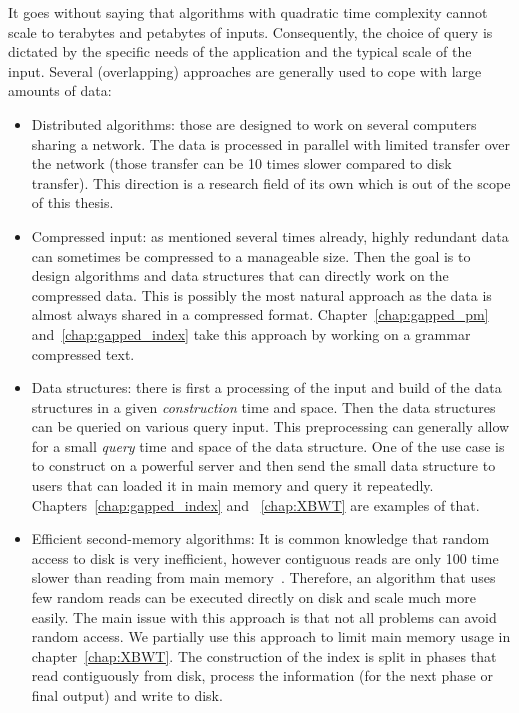 It goes without saying that algorithms with quadratic time complexity cannot scale to terabytes and petabytes of inputs. Consequently, the choice of query is dictated by the specific needs of the application and the typical scale of the input.
Several (overlapping) approaches are generally used to cope with large amounts of data:
\begin{itemize}

\item Distributed algorithms: those are designed to work on several computers sharing a network. The data is processed in parallel with limited transfer over the network (those transfer can be 10 times slower compared to disk transfer). This direction is a research field of its own which is out of the scope of this thesis.
\item Compressed input: as mentioned several times already, highly redundant data can sometimes be compressed to a manageable size. Then the goal is to design algorithms and data structures that can directly work on the compressed data. This is possibly the most natural approach as the data is almost always shared in a compressed format. Chapter~\ref{chap:gapped_pm} and~\ref{chap:gapped_index} take this approach by working on a grammar compressed text.
\item Data structures: there is first a processing of the input and build of the data structures in a given \emph{construction} time and space. Then the data structures can be queried on various query input. This preprocessing can generally allow for a small \emph{query} time and space of the data structure. One of the use case is to construct on a powerful server and then send the small data structure to users that can loaded it in main memory and query it repeatedly. Chapters~\ref{chap:gapped_index} and ~\ref{chap:XBWT} are examples of that.
\item Efficient second-memory algorithms: It is  common knowledge that random access to disk is very inefficient, however contiguous reads are only 100 time slower than reading from main memory~\cite{navarro2016compact}. Therefore, an algorithm that uses few random reads can be executed directly on disk and scale much more easily. The main issue with this approach is that not all problems can avoid random access. We partially use this approach to limit main memory usage in chapter~\ref{chap:XBWT}. The construction of the index is split in phases that read contiguously from disk, process the information (for the next phase or final output) and write to disk.

\end{itemize}
